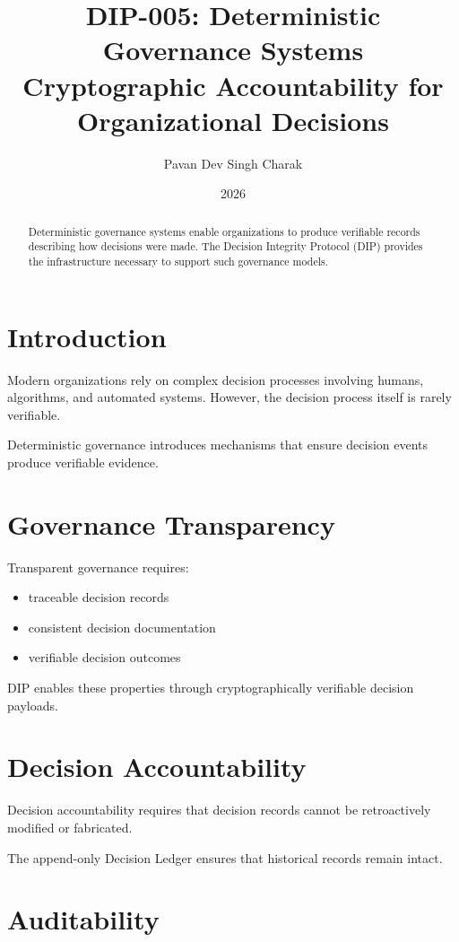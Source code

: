 \documentclass[11pt]{article}
\title{DIP-005: Deterministic Governance Systems\\
Cryptographic Accountability for Organizational Decisions}
\author{Pavan Dev Singh Charak}
\date{2026}
\begin{document}
\maketitle

\begin{abstract}

Deterministic governance systems enable organizations to produce
verifiable records describing how decisions were made. The
Decision Integrity Protocol (DIP) provides the infrastructure
necessary to support such governance models.

\end{abstract}

\section{Introduction}

Modern organizations rely on complex decision processes involving
humans, algorithms, and automated systems. However, the decision
process itself is rarely verifiable.

Deterministic governance introduces mechanisms that ensure decision
events produce verifiable evidence.

\section{Governance Transparency}

Transparent governance requires:

\begin{itemize}
\item traceable decision records
\item consistent decision documentation
\item verifiable decision outcomes
\end{itemize}

DIP enables these properties through cryptographically verifiable
decision payloads.

\section{Decision Accountability}

Decision accountability requires that decision records cannot be
retroactively modified or fabricated.

The append-only Decision Ledger ensures that historical records
remain intact.

\section{Auditability}
\end{document}

